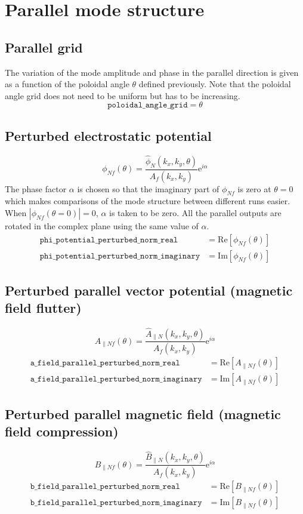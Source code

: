 \documentclass[a4paper]{report}
\begin{document}
\section{Parallel mode structure}
\subsection{Parallel grid} \label{sec:polgrid}
The variation of the mode amplitude and phase in the parallel direction is given as a function of the poloidal angle $\theta$ defined previously. Note that the poloidal angle grid does not need to be uniform but has to be increasing.
$$\texttt{poloidal\_angle\_grid}=\theta$$ 

\subsection{Perturbed electrostatic potential} \label{sec:eigenmode:phi}
$$\phi_{Nf}(\theta) = \frac{\hat{\phi}_N(k_x,k_y,\theta)}{A_f(k_x,k_y)}\textrm{e}^{i\alpha}$$
The phase factor $\alpha$ is chosen so that the imaginary part of $\phi_{Nf}$ is zero at $\theta=0$ which makes comparisons of the mode structure between different runs easier. When $|\phi_{Nf}(\theta=0)|=0$, $\alpha$ is taken to be zero. All the parallel outputs are rotated in the complex plane using the same value of $\alpha$.
\begin{align*}
\texttt{phi\_potential\_perturbed\_norm\_real}&=\textrm{Re}\left[ \phi_{Nf}(\theta) \right]\\
\texttt{phi\_potential\_perturbed\_norm\_imaginary}&=\textrm{Im}\left[ \phi_{Nf}(\theta) \right]
\end{align*}
 
\subsection{Perturbed parallel vector potential (magnetic field flutter)} \label{sec:eigenmode:apar}
$$A_{\parallel Nf}(\theta) = \frac{\hat{A}_{\parallel N}(k_x,k_y,\theta)}{A_f(k_x,k_y)}\textrm{e}^{i\alpha}$$
\begin{align*}
\texttt{a\_field\_parallel\_perturbed\_norm\_real}&=\textrm{Re}\left[ A_{\parallel Nf}(\theta) \right]\\
\texttt{a\_field\_parallel\_perturbed\_norm\_imaginary}&=\textrm{Im}\left[ A_{\parallel Nf}(\theta) \right]
\end{align*}

\subsection{Perturbed parallel magnetic field (magnetic field compression)} \label{sec:eigenmode:bpar}
$$B_{\parallel Nf}(\theta) = \frac{\hat{B}_{\parallel N}(k_x,k_y,\theta)}{A_f(k_x,k_y)}\textrm{e}^{i\alpha}$$
\begin{align*}
\texttt{b\_field\_parallel\_perturbed\_norm\_real}&=\textrm{Re}\left[ B_{\parallel Nf}(\theta) \right]\\
\texttt{b\_field\_parallel\_perturbed\_norm\_imaginary}&=\textrm{Im}\left[ B_{\parallel Nf}(\theta) \right]
\end{align*}
\end{document}
